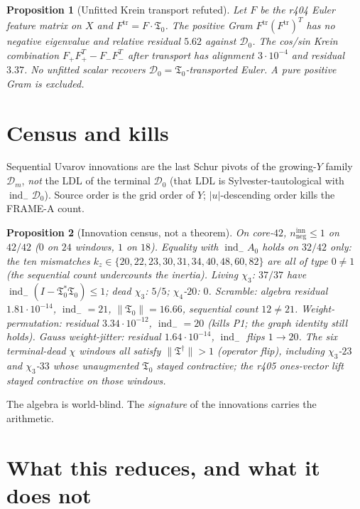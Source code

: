 \documentclass[11pt]{article}
\newtheorem{prop}{Proposition}
\theoremstyle{remark}
\newcommand{\indm}{\operatorname{ind}_{-}}
\newcommand{\Tfrak}{\mathfrak{T}}
\newcommand{\cD}{\mathcal{D}}
\begin{document}
\begin{prop}[Unfitted Krein transport refuted]\label{prop:krein}
Let $F$ be the r404 Euler feature matrix on $X$ and
$F^{\mathrm{tr}}=F\cdot\Tfrak_0$.
The positive Gram $F^{\mathrm{tr}}(F^{\mathrm{tr}})^T$ has
no negative eigenvalue and relative residual $5.62$ against
$\cD_0$.
The cos/sin Krein combination $F_+F_+^T-F_-F_-^T$ after
transport has alignment $3\cdot 10^{-4}$ and residual $3.37$.
No unfitted scalar recovers $\cD_0=\Tfrak_0$-transported Euler.
A pure positive Gram is excluded.
\end{prop}

\section{Census and kills}\label{sec:census}

Sequential Uvarov innovations are the last Schur pivots of
the growing-$Y$ family $\cD_m$, \emph{not} the LDL of the
terminal $\cD_0$ (that LDL is Sylvester-tautological with
$\indm\cD_0$).
Source order is the grid order of $Y$; $|u|$-descending order
kills the FRAME-A count.

\begin{prop}[Innovation census, not a theorem]\label{prop:census}
On core-$42$, $n_{\mathrm{neg}}^{\mathrm{inn}}\le 1$ on
$42/42$ ($0$ on $24$ windows, $1$ on $18$).
Equality with $\indm A_0$ holds on $32/42$ only: the ten
mismatches $k_z\in\{20,22,23,30,31,34,40,48,60,82\}$ are all
of type $0\neq 1$ (the sequential count undercounts the
inertia).
Living $\chi_3$: $37/37$ have $\indm(I-\Tfrak_0^*\Tfrak_0)\le 1$;
dead $\chi_3$: $5/5$; $\chi_4$-$20$: $0$.
Scramble: algebra residual $1.81\cdot 10^{-14}$,
$\indm=21$, $\|\Tfrak_0\|=16.66$, sequential count $12\neq 21$.
Weight-permutation: residual $3.34\cdot 10^{-12}$,
$\indm=20$ (kills P1; the graph identity still holds).
Gauss weight-jitter: residual $1.64\cdot 10^{-14}$,
$\indm$ flips $1\to 20$.
The six terminal-dead $\chi$ windows all satisfy
$\|\Tfrak^\dagger\|>1$ (operator flip), including
$\chi_3$-$23$ and $\chi_3$-$33$ whose unaugmented
$\Tfrak_0$ stayed contractive; the r405 ones-vector lift
stayed contractive on those windows.
\end{prop}

The algebra is world-blind.
The \emph{signature} of the innovations carries the arithmetic.

\section{What this reduces, and what it does not}\label{sec:red}
\end{document}

